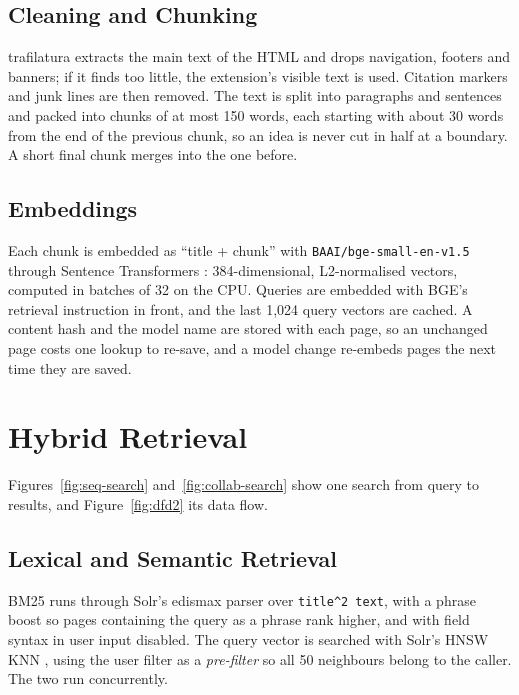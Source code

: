 \subsection{Cleaning and Chunking}

trafilatura \cite{barbaresi2021trafilatura} extracts the main text of the
HTML and drops navigation, footers and banners; if it finds too little, the
extension's visible text is used. Citation markers and junk lines are then
removed. The text is split into paragraphs and sentences and packed into
chunks of at most 150 words, each starting with about 30 words from the end
of the previous chunk, so an idea is never cut in half at a boundary. A
short final chunk merges into the one before.

\subsection{Embeddings}

Each chunk is embedded as ``title + chunk'' with \texttt{BAAI/bge-small-en-v1.5}
\cite{xiao2023bge} through Sentence Transformers \cite{reimers2019sbert}:
384-dimensional, L2-normalised vectors, computed in batches of 32 on the CPU.
Queries are embedded with BGE's retrieval instruction in front, and the last
1{,}024 query vectors are cached. A content hash and the model name are
stored with each page, so an unchanged page costs one lookup to re-save, and
a model change re-embeds pages the next time they are saved.

\section{Hybrid Retrieval}

Figures~\ref{fig:seq-search} and~\ref{fig:collab-search} show one search from query to results, and Figure~\ref{fig:dfd2} its data flow.

\subsection{Lexical and Semantic Retrieval}

BM25 \cite{robertson2009bm25} runs through Solr's edismax parser over
\texttt{title\^{}2 text}, with a phrase boost so pages containing the query as
a phrase rank higher, and with field syntax in user input disabled. The
query vector is searched with Solr's HNSW KNN \cite{solr}, using the user
filter as a \emph{pre-filter} so all 50 neighbours belong to the caller. The
two run concurrently.

